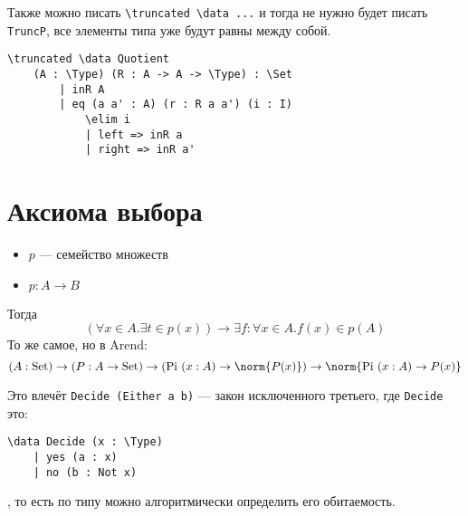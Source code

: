Также можно писать \texttt{\textbackslash{}truncated \textbackslash{}data ...} и тогда не нужно будет писать \texttt{TruncP}, все элементы типа уже будут равны между собой.

\begin{verbatim}
\truncated \data Quotient
    (A : \Type) (R : A -> A -> \Type) : \Set
        | inR A
        | eq (a a' : A) (r : R a a') (i : I)
            \elim i
            | left => inR a
            | right => inR a'
\end{verbatim}

\section{Аксиома выбора}

\begin{itemize}
    \item \(p\) --- семейство множеств
    \item \(p : A \to B\)
\end{itemize}
Тогда
\[(\forall x \in A.\exists t \in p(x)) \to \exists f : \forall x \in A.f(x) \in p(A)\]
То же самое, но в Arend:
\[(A : \mathrm{Set}) \to (P : A \to \mathrm{Set}) \to (\mathrm{Pi}\ (x : A) \to \norm{P(x)}) \to \norm{\mathrm{Pi}\ (x : A) \to P(x)}\]

Это влечёт \texttt{Decide (Either a b)} --- закон исключенного третьего, где \texttt{Decide} это:
\begin{verbatim}
\data Decide (x : \Type)
    | yes (a : x)
    | no (b : Not x)
\end{verbatim}
, то есть по типу можно алгоритмически определить его обитаемость.
